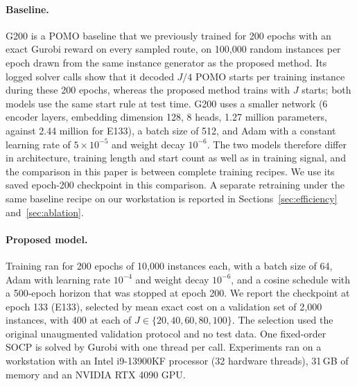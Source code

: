 \documentclass[preprint,12pt,authoryear]{elsarticle}
\begin{document}
\paragraph{Baseline.} G200 is a POMO baseline that we previously trained for 200 epochs with an exact Gurobi reward on every sampled route, on 100,000 random instances per epoch drawn from the same instance generator as the proposed method. Its logged solver calls show that it decoded $J/4$ POMO starts per training instance during these 200 epochs, whereas the proposed method trains with $J$ starts; both models use the same start rule at test time. G200 uses a smaller network (6 encoder layers, embedding dimension 128, 8 heads, 1.27 million parameters, against 2.44 million for E133), a batch size of 512, and Adam with a constant learning rate of $5 \times 10^{-5}$ and weight decay $10^{-6}$. The two models therefore differ in architecture, training length and start count as well as in training signal, and the comparison in this paper is between complete training recipes. We use its saved epoch-200 checkpoint in this comparison. A separate retraining under the same baseline recipe on our workstation is reported in Sections~\ref{sec:efficiency} and~\ref{sec:ablation}.

\paragraph{Proposed model.} Training ran for 200 epochs of 10,000 instances each, with a batch size of 64, Adam with learning rate $10^{-4}$ and weight decay $10^{-6}$, and a cosine schedule with a 500-epoch horizon that was stopped at epoch 200. We report the checkpoint at epoch 133 (E133), selected by mean exact cost on a validation set of 2,000 instances, with 400 at each of $J \in \{20,40,60,80,100\}$. The selection used the original unaugmented validation protocol and no test data. One fixed-order SOCP is solved by Gurobi with one thread per call. Experiments ran on a workstation with an Intel i9-13900KF processor (32 hardware threads), 31\,GB of memory and an NVIDIA RTX 4090 GPU.
\end{document}
